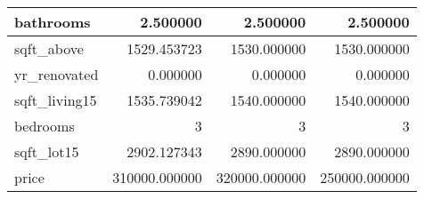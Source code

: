 \begin{table}[H]
\begin{tabular}{|l|r|r|r|}
\hline bathrooms & \cellcolor[rgb]{0.9, 0.54, 0.52} 2.500000 & \cellcolor[rgb]{0.9, 0.54, 0.52} 2.500000 & \cellcolor[rgb]{0.9, 0.54, 0.52} 2.500000 \\
\hline sqft\_above & \cellcolor[rgb]{0.9, 0.54, 0.52} 1529.453723 & 1530.000000 & 1530.000000 \\
\hline yr\_renovated & \cellcolor[rgb]{0.9, 0.54, 0.52} 0.000000 & \cellcolor[rgb]{0.9, 0.54, 0.52} 0.000000 & \cellcolor[rgb]{0.9, 0.54, 0.52} 0.000000 \\
\hline sqft\_living15 & \cellcolor[rgb]{0.9, 0.54, 0.52} 1535.739042 & 1540.000000 & 1540.000000 \\
\hline bedrooms & \cellcolor[rgb]{0.9, 0.54, 0.52} 3 & \cellcolor[rgb]{0.9, 0.54, 0.52} 3 & \cellcolor[rgb]{0.9, 0.54, 0.52} 3 \\
\hline sqft\_lot15 & \cellcolor[rgb]{0.9, 0.54, 0.52} 2902.127343 & 2890.000000 & 2890.000000 \\
\hline price & \cellcolor[rgb]{0.9, 0.54, 0.52} 310000.000000 & 320000.000000 & 250000.000000 \\
\hline
\end{tabular}
\end{table}
